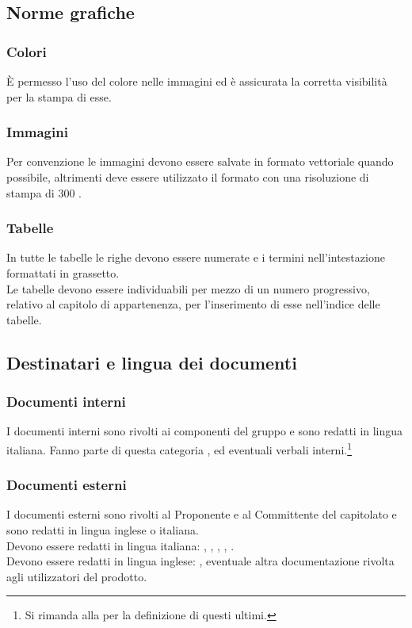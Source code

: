 \subsection{Norme grafiche}

\subsubsection{Colori}
\`{E} permesso l'uso del colore nelle immagini ed è assicurata la corretta visibilità per la stampa di esse.

\subsubsection{Immagini}
Per convenzione le immagini devono essere salvate in formato vettoriale  quando possibile, altrimenti deve essere utilizzato il formato  con una risoluzione di stampa di 300 .

\subsubsection{Tabelle}
In tutte le tabelle le righe devono essere numerate e i termini nell'intestazione formattati in grassetto.
\\
Le tabelle devono essere individuabili per mezzo di un numero progressivo, relativo al capitolo di appartenenza, per l'inserimento di esse nell'indice delle tabelle.

\subsection{Destinatari e lingua dei documenti}
\subsubsection{Documenti interni}
I documenti interni sono rivolti ai componenti del gruppo e sono redatti in lingua italiana. Fanno parte di questa categoria \NormeDiProgetto, \StudioDiFattibilita{} ed eventuali verbali interni.\footnote[1]{Si rimanda alla  per la definizione di questi ultimi.}

\subsubsection{Documenti esterni}
I documenti esterni sono rivolti al Proponente e al Committente del capitolato e sono redatti in lingua inglese o italiana.\\
Devono essere redatti in lingua italiana: \PianoDiProgetto, \PianoDiQualifica, \SpecificaTecnica, \DefinizioneDiProdotto, \Glossario.\\
Devono essere redatti in lingua inglese: \ManualeUtente, eventuale altra documentazione rivolta agli utilizzatori del prodotto.


